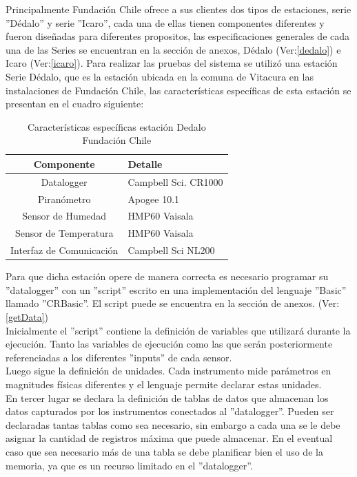 Principalmente Fundación Chile ofrece a sus clientes dos tipos de estaciones, serie ''Dédalo'' y serie ''Icaro'', cada una de ellas tienen componentes diferentes y fueron diseñadas para diferentes propositos, las especificaciones generales de cada una de las Series se encuentran en la sección de anexos, Dédalo (Ver:\ref{dedalo}) e Icaro (Ver:\ref{icaro}). Para realizar las pruebas del sistema se utilizó una estación Serie Dédalo, que es la estación ubicada en la comuna de Vitacura en las instalaciones de Fundación Chile, las características específicas de esta estación se presentan en el cuadro siguiente:

\begin{table}[h!]
\label{estacionDedalo}
\caption{Características específicas estación Dedalo Fundación Chile}
\begin{tabular}{| c | p{11cm} |}
        \hline
        \textbf{Componente}  &       \textbf{Detalle}        \\
        \hline
	Datalogger&Campbell Sci. CR1000\\
	\hline
	Piranómetro&Apogee 10.1\\
	\hline
	Sensor de Humedad&HMP60 Vaisala\\
	\hline
	Sensor de Temperatura&HMP60 Vaisala\\
	\hline
	Interfaz de Comunicación&Campbell Sci NL200\\
	\hline
\end{tabular}
\end{table}

Para que dicha estación opere de manera correcta es necesario programar su ''datalogger'' con un ''script'' escrito en una implementación del lenguaje ''Basic'' llamado ''CRBasic''. El script puede se encuentra  en la sección de anexos. (Ver: \ref{getData})\\

Inicialmente el ''script'' contiene la definición de variables que utilizará durante la ejecución. Tanto las variables de ejecución como las que serán posteriormente referenciadas a los diferentes ''inputs'' de cada sensor.\\

Luego sigue la definición de unidades. Cada instrumento mide parámetros en magnitudes físicas diferentes y el lenguaje permite declarar estas unidades.\\

En tercer lugar se declara la definición de tablas de datos que almacenan los datos capturados por los instrumentos conectados al ''datalogger''. Pueden ser declaradas tantas tablas como sea necesario, sin embargo a cada una se le debe asignar la cantidad de registros máxima que puede almacenar. En el eventual caso que sea necesario más de una tabla se debe planificar bien el uso de la memoria, ya que es un recurso limitado en el ''datalogger''.\\

